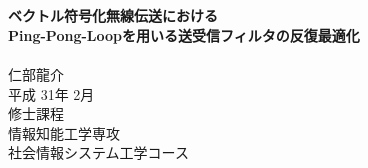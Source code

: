 \documentclass[11pt,oneside,titlepage]{jsbook}
\begin{document}
\captiondelim{ }%
\rhead{\textbf{\thepage}}　　　%
\cfoot{}　　　　　　　　　　　%
\renewcommand{\headrulewidth}{0.4pt}
\renewcommand{\footrulewidth}{0.4pt}
\setlength{\baselineskip}{18.95pt}

\makeatletter
\renewcommand{\chapter}{
  \if@openright\cleardoublepage\else\clearpage\fi
  \global\@topnum\z@
  \secdef\@chapter\@schapter}
\makeatother

\vspace*{3cm}%
\begin{center}%
{\Large \textbf{}}\\%
\vspace{3mm}
{\Large \textbf{ベクトル符号化無線伝送における\\Ping-Pong-Loopを用いる送受信フィルタの反復最適化}} \\
\vspace{5cm}%
\indent \\
{\Large 仁部龍介} \\
\vspace{5mm}
{\Large 平成 31年 2月} \\
\vspace{5mm}
{\Large 修士課程 \\ 情報知能工学専攻 \\ 社会情報システム工学コース} \\
\end{center}%
\thispagestyle{empty}%


%

\frontmatter %
\clearpage %



\tableofcontents %
\rhead{}

\mainmatter %

\newpage
\rhead{\thepage}
\backmatter          %
%
\end{document}
